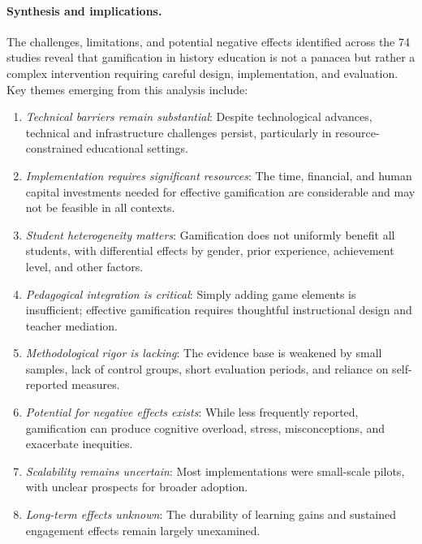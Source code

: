 \documentclass[a4paper,fleqn]{cas-sc}
\begin{document}
\paragraph{Synthesis and implications.}

The challenges, limitations, and potential negative effects identified across the 74 studies reveal that gamification in history education is not a panacea but rather a complex intervention requiring careful design, implementation, and evaluation. Key themes emerging from this analysis include:

\begin{enumerate}[noitemsep]
 \item \textit{Technical barriers remain substantial}: Despite technological advances, technical and infrastructure challenges persist, particularly in resource-constrained educational settings.
 
 \item \textit{Implementation requires significant resources}: The time, financial, and human capital investments needed for effective gamification are considerable and may not be feasible in all contexts.
 
 \item \textit{Student heterogeneity matters}: Gamification does not uniformly benefit all students, with differential effects by gender, prior experience, achievement level, and other factors.
 
 \item \textit{Pedagogical integration is critical}: Simply adding game elements is insufficient; effective gamification requires thoughtful instructional design and teacher mediation.
 
 \item \textit{Methodological rigor is lacking}: The evidence base is weakened by small samples, lack of control groups, short evaluation periods, and reliance on self-reported measures.
 
 \item \textit{Potential for negative effects exists}: While less frequently reported, gamification can produce cognitive overload, stress, misconceptions, and exacerbate inequities.
 
 \item \textit{Scalability remains uncertain}: Most implementations were small-scale pilots, with unclear prospects for broader adoption.
 
 \item \textit{Long-term effects unknown}: The durability of learning gains and sustained engagement effects remain largely unexamined.
\end{enumerate}
\end{document}
